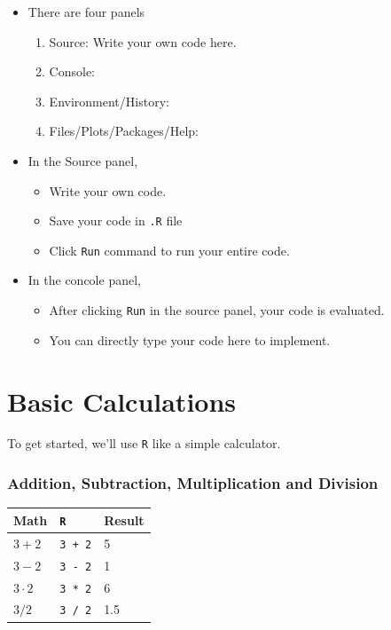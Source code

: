\documentclass[]{book}
\providecommand{\tightlist}{%
  \setlength{\itemsep}{0pt}\setlength{\parskip}{0pt}}
\begin{document}
\begin{itemize}
\tightlist
\item
  There are four panels

  \begin{enumerate}
  \def\labelenumi{\arabic{enumi}.}
  \tightlist
  \item
    Source: Write your own code here.
  \item
    Console:
  \item
    Environment/History:
  \item
    Files/Plots/Packages/Help:
  \end{enumerate}
\item
  In the Source panel,

  \begin{itemize}
  \tightlist
  \item
    Write your own code.
  \item
    Save your code in \texttt{.R} file
  \item
    Click \texttt{Run} command to run your entire code.
  \end{itemize}
\item
  In the concole panel,

  \begin{itemize}
  \tightlist
  \item
    After clicking \texttt{Run} in the source panel, your code is
    evaluated.
  \item
    You can directly type your code here to implement.
  \end{itemize}
\end{itemize}

\section{Basic Calculations}\label{basic-calculations}

To get started, we'll use \texttt{R} like a simple calculator.

\subsubsection*{Addition, Subtraction, Multiplication and
Division}\label{addition-subtraction-multiplication-and-division}

\begin{longtable}[]{@{}lll@{}}
\toprule
Math & \texttt{R} & Result\tabularnewline
\midrule
\endhead
\(3 + 2\) & \texttt{3\ +\ 2} & 5\tabularnewline
\(3 - 2\) & \texttt{3\ -\ 2} & 1\tabularnewline
\(3 \cdot2\) & \texttt{3\ *\ 2} & 6\tabularnewline
\(3 / 2\) & \texttt{3\ /\ 2} & 1.5\tabularnewline
\bottomrule
\end{longtable}
\end{document}
